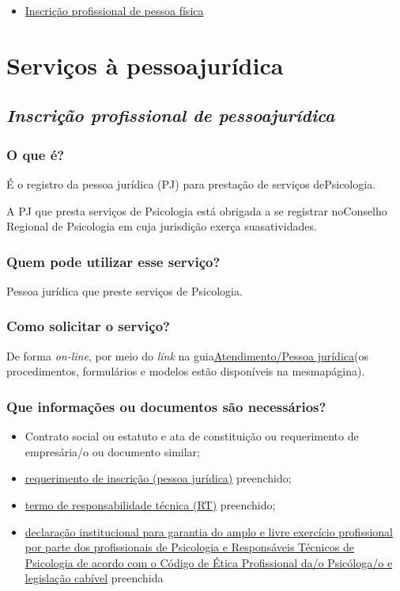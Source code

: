 \begin{itemize}
  \item  \hyperref[]{Inscrição  profissional de pessoa física}
\end{itemize}

\part{Serviços à pessoajurídica}

\chapter{\texorpdfstring{\emph{Inscrição profissional de pessoajurídica}}{Inscrição profissional de pessoa jurídica}}

\section{O que é?}

É o registro da pessoa jurídica (PJ) para prestação de serviços dePsicologia.

A PJ que presta serviços de Psicologia está obrigada a se registrar noConselho Regional de Psicologia em cuja jurisdição exerça suasatividades.

\section{Quem pode utilizar esse serviço?}

Pessoa jurídica que preste serviços de Psicologia.

\section{Como solicitar o serviço?}

De forma \emph{on-line}, por meio do \emph{link} na guia\href{https://www.crpsp.org/pagina/view/30}{Atendimento/Pessoa jurídica}(os procedimentos, formulários e modelos estão disponíveis na mesmapágina).

\section{Que informações ou documentos são necessários?}

\begin{itemize}
  \item  Contrato social ou estatuto e ata de constituição ou requerimento de  empresária/o ou documento similar;
  \item  \hyperref[]{requerimento  de inscrição (pessoa jurídica)} preenchido;
  \item  \hyperref[]{termo  de responsabilidade técnica (RT)} preenchido;
  \item  \hyperref[]{declaração  institucional para garantia do amplo e livre exercício profissional  por parte dos profissionais de Psicologia e Responsáveis Técnicos de  Psicologia de acordo com o Código de Ética Profissional da/o  Psicóloga/o e legislação cabível} preenchida
\end{itemize}

